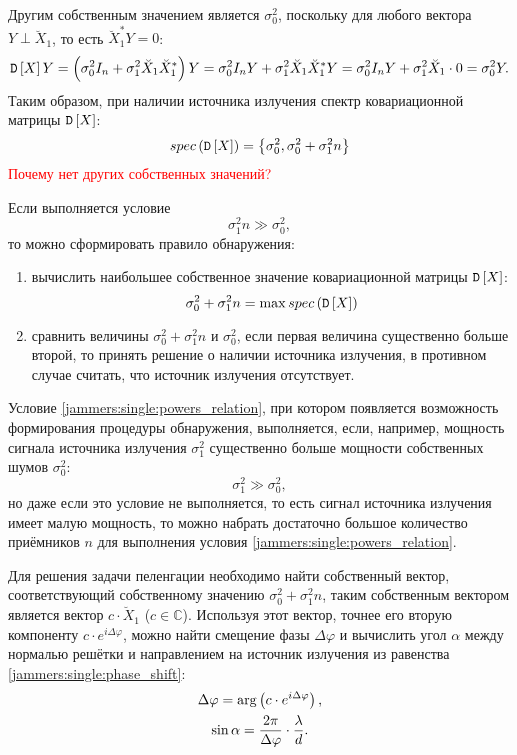 Другим собственным значением является $\sigma_0^2$, поскольку для любого вектора $Y \perp \breve{X}_1$, то есть $\breve{X}_1^* Y = 0$:
\[
    \mathtt{D} \left [ X \right ] Y
    = \left ( \sigma_0^2 I_n + \sigma_1^2 \breve{X}_1 \breve{X}_1^* \right ) Y
    = \sigma_0^2 I_n Y + \sigma_1^2 \breve{X}_1 \breve{X}_1^* Y
    = \sigma_0^2 I_n Y + \sigma_1^2 \breve{X}_1 \cdot 0
    = \sigma_0^2 Y .
\]
Таким образом, при наличии источника излучения спектр ковариационной матрицы $\mathtt{D} \left [ X \right ]$:
\[
    spec \left ( \mathtt{D} \left [ X \right ] \right ) = \left \{ \sigma_0^2, \sigma_0^2 + \sigma_1^2 n \right \}
\]
\textcolor{red}{Почему нет других собственных значений?}

Если выполняется условие
\begin{equation}
    \label{jammers:single:powers_relation}
    \sigma_1^2 n \gg \sigma_0^2 ,
\end{equation}
то можно сформировать правило обнаружения:
\begin{enumerate}
    \item вычислить наибольшее собственное значение ковариационной матрицы $\mathtt{D} \left [ X \right ]$:
    \[
        \sigma_0^2 + \sigma_1^2 n = \max spec \left ( \mathtt{D} \left [ X \right ] \right )
    \]
    \item сравнить величины $\sigma_0^2 + \sigma_1^2 n$ и $\sigma_0^2$, если первая величина существенно больше второй, то принять решение о наличии источника
    излучения, в противном случае считать, что источник излучения отсутствует.
\end{enumerate}

Условие \eqref{jammers:single:powers_relation}, при котором появляется возможность формирования процедуры обнаружения, выполняется, если, например, мощность
сигнала источника излучения $\sigma_1^2$ существенно больше мощности собственных шумов $\sigma_0^2$:
\[
    \sigma_1^2 \gg \sigma_0^2 ,
\]
но даже если это условие не выполняется, то есть сигнал источника излучения имеет малую мощность, то можно набрать достаточно большое количество приёмников $n$
для выполнения условия \eqref{jammers:single:powers_relation}.

Для решения задачи пеленгации необходимо найти собственный вектор, соответствующий собственному значению $\sigma_0^2 + \sigma_1^2 n$, таким собственным вектором
является вектор $c \cdot \breve{X}_1$ ($c \in \mathbb{C}$). Используя этот вектор, точнее его вторую компоненту $c \cdot e^{i \Delta \varphi}$, можно найти смещение фазы
$\Delta \varphi$ и вычислить угол $\alpha$ между нормалью решётки и направлением на источник излучения из равенства \eqref{jammers:single:phase_shift}:
\begin{gather}
    \Delta \varphi = \arg \left ( c \cdot e^{i \Delta \varphi} \right ), \notag \\
    \sin \alpha = \frac{2 \pi}{\Delta \varphi} \cdot \frac{\lambda}{d} \label{jammers:single:angle}.
\end{gather}

